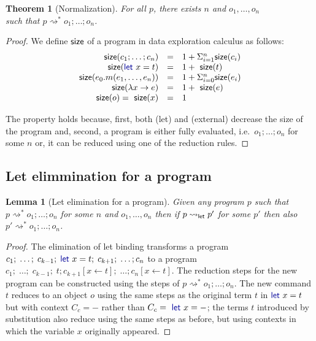 \documentclass[english,submission]{programming}
\newcounter{thc}
\theoremstyle{plain}
\newtheorem{lem}[thc]{Lemma}
\newtheorem{theorem}[thc]{Theorem}
\theoremstyle{definition}
\newcommand{\ident}[1]{\textnormal{\textcolor{idclr}{\sffamily #1}}}
\newcommand{\kvd}[1]{\textnormal{\textcolor{kvdclr}{\sffamily #1}}}
\newcommand{\rname}[1]{{\sffamily(#1)}}
\begin{document}
\begin{theorem}[Normalization]
\raggedrigth
For all $p$, there exists $n$ and $o_1, \ldots, o_n$ \\
such that $p\rightsquigarrow^{*} o_1;\ldots;o_n$.
\end{theorem}
\begin{proof}
We define $\ident{size}$ of a program in data exploration calculus as follows:
\begin{equation}
\begin{array}{rcl}
\ident{size}(c_1; \ldots; c_n) &=& 1 + \Sigma^{n}_{i=1} \ident{size}(c_i)\\
\ident{size}(\kvd{let}~x=t) &=& 1 + \ident{size}(t)\\
\ident{size}(e_0.m(e_1, \ldots, e_n)) &=& 1 + \Sigma^{n}_{i=0} \ident{size}(e_i)\\
\ident{size}(\lambda x\rightarrow e) &=& 1 + \ident{size}(e)\\
\ident{size}(o) = \ident{size}(x) &=& 1\\
\end{array}
\end{equation}

\noindent
The property holds because, first, both \rname{let} and \rname{external} decrease the \ident{size}
of the program and, second, a program is either fully evaluated, i.e.~$o_1;\ldots;o_n$ for some $n$
or, it can be reduced using one of the reduction rules.
\end{proof}


\subsection{Let elimmination for a program}
\label{sec:let-lang-elimination}

\begin{lem}[Let elimination for a program]
\label{thm:let-lang-elimination-proof}
Given any program $p$ such that $p \rightsquigarrow^{*} o_1;\ldots;o_n$ for some $n$ and $o_1, \ldots, o_n$
then if $p \rightsquigarrow_\ident{let} p'$ for some $p'$ then also $p' \rightsquigarrow^{*} o_1;\ldots;o_n$.
\end{lem}
\begin{proof}
The elimination of let binding transforms a program $c_1;\; \ldots;\; c_{k-1};\; \kvd{let}~x=t;\; c_{k+1};\; \ldots; c_n$
to a program $c_1;\; \ldots;\; c_{k-1};\; t; c_{k+1}[x\leftarrow t];\; \ldots; c_n[x\leftarrow t]$.
The reduction steps for the new program can be constructed using the steps of $p \rightsquigarrow^{*} o_1;\ldots;o_n$.
The new command $t$ reduces to an object $o$ using the same steps as the original term $t$
in $\kvd{let}~x=t$ but with context $C_c = -$ rather than $C_c = \kvd{let}~x=-$; the terms $t$
introduced by substitution also reduce using the same steps as before, but using
contexts in which the variable $x$ originally appeared.
\end{proof}
\end{document}

